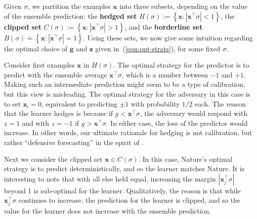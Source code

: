 \documentclass{colt2015} %
\newcommand{\vx}{\mathbf{x}}
\newcommand{\vg}{\mathbf{g}}
\newcommand{\vz}{\mathbf{z}}
\newcommand{\abs}[1]{\left| #1 \right|}
\begin{document}
Given $\sigma$, we partition the examples $\vx$ into three subsets, depending on the value of the ensemble prediction: 
the {\bf hedged set} $ H (\sigma) := \left\{ \vx :  |\vx^\top \sigma|<1 \right\} $, 
the {\bf clipped set} $C (\sigma) := \left\{ \vx :  |\vx^\top \sigma|>1 \right\} $, 
and the {\bf borderline set} $B (\sigma) \doteq \left\{ \vx :  |\vx^\top \sigma|=1 \right\} $.
Using these sets, we now give some intuition regarding the optimal
choice of $\vg$ and $\vz$ given in~(\ref{eqn:opt-strats}), for some fixed $\sigma$.

Consider first examples $\vx$ in $H(\sigma)$. The optimal strategy for the predictor is
to predict with the ensemble average $\vx^\top \sigma$, which is
a number between $-1$ and $+1$. Making such an intermediate prediction
might seem to be a type of calibration, but this view is misleading. The
optimal strategy for the adversary in this case is to set $\vz_i=0$, 
equivalent to predicting $\pm 1$ with probability $1/2$ each. 
The reason that the learner hedges is because if $g < \vx^\top \sigma$, 
the adversary would respond with $z=1$
and with $z=-1$ if $g > \vx^\top \sigma$. 
In either case, the loss of the predictor would increase. 
In other words, our ultimate rationale for hedging is not calibration, 
but rather ``defensive forecasting'' in the spirit of \cite{VTS05}.

Next we consider the clipped set $\vx \in C(\sigma)$. In this case, Nature's optimal strategy
is to predict deterministically, and so the learner matches Nature. It
is interesting to note that with all else held equal, increasing the margin 
$\abs{\vx_j^\top \sigma}$ beyond 1 is sub-optimal for the learner. 
Qualitatively, the reason is that while $\vx_j^\top \sigma$
continues to increase, the prediction for the learner is clipped, 
and so the value for the learner does not increase with the ensemble prediction.
\end{document}
